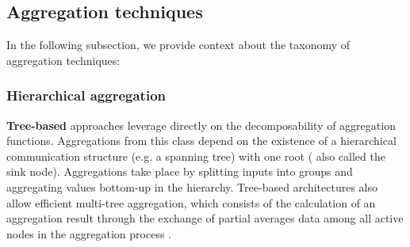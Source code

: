 \begin{table}[]
    \centering
    \caption{Decomposability and duplicate sensitiveness of aggregation functions}
    \label{table:aggregation_functions}
\end{table}



\subsection{Aggregation techniques}

In the following subsection, we provide context about the taxonomy of aggregation techniques:

\subsubsection*{Hierarchical aggregation}

\textbf{Tree-based} approaches leverage directly on the decomposability of aggregation functions. Aggregations from this class depend on the existence of a hierarchical communication structure (e.g. a spanning tree) with one root ( also called the sink node). Aggregations take place by splitting inputs into groups and aggregating values bottom-up in the hierarchy.  Tree-based architectures also allow efficient multi-tree aggregation, which consists of the calculation of an aggregation result through the exchange of partial averages data among all active nodes in the aggregation process \cite{akosThesis}. 

